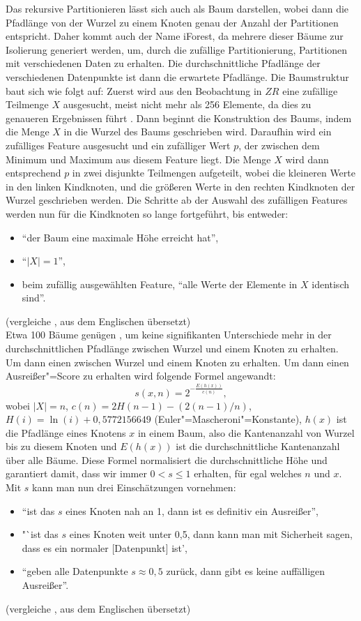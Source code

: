 Das rekursive Partitionieren lässt sich auch als Baum darstellen, wobei dann die Pfadlänge von der Wurzel zu einem Knoten genau der Anzahl der Partitionen entspricht. Daher kommt auch der Name iForest, da mehrere dieser Bäume zur Isolierung generiert werden, um, durch die zufällige Partitionierung, Partitionen mit verschiedenen Daten zu erhalten. Die durchschnittliche Pfadlänge der verschiedenen Datenpunkte ist dann die erwartete Pfadlänge. Die Baumstruktur baut sich wie folgt auf: Zuerst wird aus den Beobachtung in $ZR$ eine zufällige Teilmenge $X$ ausgesucht, meist nicht mehr als 256 Elemente, da dies zu genaueren Ergebnissen führt \cite[Ch. 4.1]{iForest}. Dann beginnt die Konstruktion des Baums, indem die Menge $X$ in die Wurzel des Baums geschrieben wird. Daraufhin wird ein zufälliges Feature ausgesucht und ein zufälliger Wert $p$, der zwischen dem Minimum und Maximum aus diesem Feature liegt. Die Menge $X$ wird dann entsprechend $p$ in zwei disjunkte Teilmengen aufgeteilt, wobei die kleineren Werte in den linken Kindknoten, und die größeren Werte in den rechten Kindknoten der Wurzel geschrieben werden. Die Schritte ab der Auswahl des zufälligen Features werden nun für die Kindknoten so lange fortgeführt, bis entweder:
\begin{itemize}
    \item "`der Baum eine maximale Höhe erreicht hat"',
    \item "`$|X|=1$"',
    \item beim zufällig ausgewählten Feature, "`alle Werte der Elemente in $X$  identisch sind"'.
\end{itemize}
(vergleiche \cite[Ch. 2]{iForest}, aus dem Englischen übersetzt) \\
Etwa 100 Bäume genügen \cite[Ch. 4.1]{iForest}, um keine signifikanten Unterschiede mehr in der durchschnittlichen Pfadlänge zwischen Wurzel und einem Knoten zu erhalten. Um dann einen zwischen Wurzel und einem Knoten zu erhalten. Um dann einen Ausreißer"=Score zu erhalten wird folgende Formel angewandt:
\[ s(x,n)=2^{-\frac{E(h(x))}{c(n)}}, \]
wobei $|X|=n$, $c(n)=2H(n-1)-(2(n-1)/n)$, $H(i)=\ln(i) + 0,5772156649$ (Euler"=Mascheroni"=Konstante), $h(x)$ ist die Pfadlänge eines Knotens $x$ in einem Baum, also die Kantenanzahl von Wurzel bis zu diesem Knoten und $E(h(x))$ ist die durchschnittliche Kantenanzahl über alle Bäume. Diese Formel normalisiert die durchschnittliche Höhe und garantiert damit, dass wir immer $0 < s \le 1$ erhalten, für egal welches $n$ und $x$. Mit $s$ kann man nun drei Einschätzungen vornehmen:
\begin{itemize}
    \item "`ist das $s$ eines Knoten nah an 1, dann ist es definitiv ein Ausreißer"',
    \item "`ist das $s$ eines Knoten weit unter 0,5, dann kann man mit Sicherheit sagen, dass es ein normaler [Datenpunkt] ist',
    \item "`geben alle Datenpunkte $s \approx 0,5$ zurück, dann gibt es keine auffälligen Ausreißer"'.
\end{itemize}
(vergleiche \cite[Ch. 2]{iForest}, aus dem Englischen übersetzt) \\